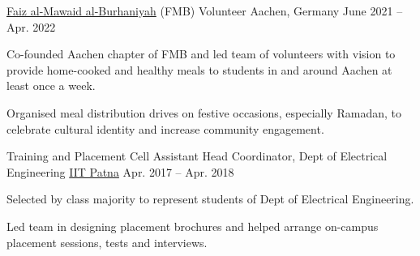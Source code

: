 
\begin{cvpositions}

\cvrole
	{\href{https://www.thedawoodibohras.com/about-the-bohras/faiz-al-mawaid-al-burhaniyah/}{Faiz al-Mawaid al-Burhaniyah} (FMB)} %
	{Volunteer} %
	{Aachen, Germany} %
	{June 2021 -- Apr. 2022} %
	{\begin{cvitems} %
		\item {Co-founded Aachen chapter of FMB and led team of volunteers with vision to provide home-cooked and healthy meals to students in and around Aachen at least once a week.}
		\item {Organised meal distribution drives on festive occasions, especially Ramadan, to celebrate cultural identity and increase community engagement.}
	\end{cvitems}}

\cvrole
	{Training and Placement Cell} %
	{Assistant Head Coordinator, Dept of Electrical Engineering} %
	{\href{https://www.iitp.ac.in}{IIT Patna}} %
	{Apr. 2017 -- Apr. 2018} %
	{\begin{cvitems} %
		\item {Selected by class majority to represent students of Dept of Electrical Engineering.}
		\item {Led team in designing placement brochures and helped arrange on-campus placement sessions, tests and interviews.}
	\end{cvitems}}


\end{cvpositions}
